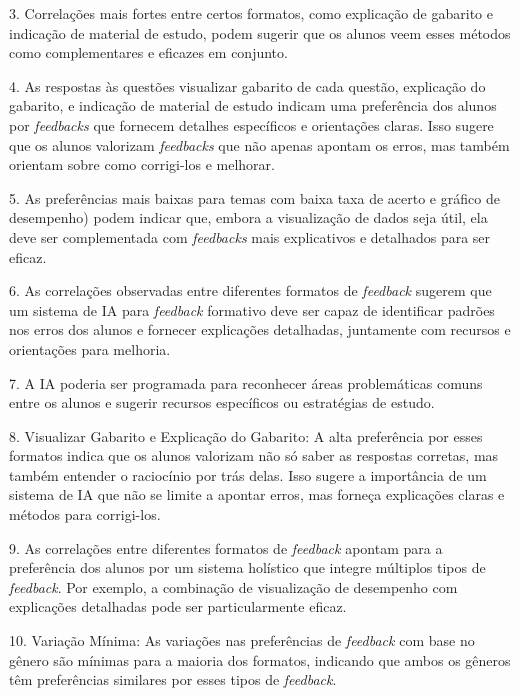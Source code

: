 3. Correlações mais fortes entre certos formatos, como explicação de gabarito e indicação de material de estudo, podem sugerir que os alunos veem esses métodos como complementares e eficazes em conjunto.

4. As respostas às questões visualizar gabarito de cada questão, explicação do gabarito, e indicação de material de estudo indicam uma preferência dos alunos por \textit{feedbacks} que fornecem detalhes específicos e orientações claras. Isso sugere que os alunos valorizam \textit{feedbacks} que não apenas apontam os erros, mas também orientam sobre como corrigi-los e melhorar.

5. As preferências mais baixas para temas com baixa taxa de acerto e gráfico de desempenho) podem indicar que, embora a visualização de dados seja útil, ela deve ser complementada com \textit{feedbacks} mais explicativos e detalhados para ser eficaz.

6. As correlações observadas entre diferentes formatos de \textit{feedback} sugerem que um sistema de IA para \textit{feedback} formativo deve ser capaz de identificar padrões nos erros dos alunos e fornecer explicações detalhadas, juntamente com recursos e orientações para melhoria.

7. A IA poderia ser programada para reconhecer áreas problemáticas comuns entre os alunos e sugerir recursos específicos ou estratégias de estudo.

8. Visualizar Gabarito e Explicação do Gabarito: A alta preferência por esses formatos indica que os alunos valorizam não só saber as respostas corretas, mas também entender o raciocínio por trás delas. Isso sugere a importância de um sistema de IA que não se limite a apontar erros, mas forneça explicações claras e métodos para corrigi-los.

9. As correlações entre diferentes formatos de \textit{feedback} apontam para a preferência dos alunos por um sistema holístico que integre múltiplos tipos de \textit{feedback}. Por exemplo, a combinação de visualização de desempenho com explicações detalhadas pode ser particularmente eficaz.

10. Variação Mínima: As variações nas preferências de \textit{feedback} com base no gênero são mínimas para a maioria dos formatos, indicando que ambos os gêneros têm preferências similares por esses tipos de \textit{feedback}.

